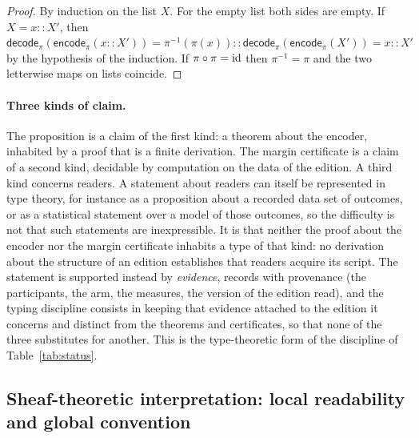 \begin{proof}
By induction on the list $X$. For the empty list both sides are empty. If $X=x::X'$, then $\mathsf{decode}_\pi(\mathsf{encode}_\pi(x::X'))=\pi^{-1}(\pi(x))::\mathsf{decode}_\pi(\mathsf{encode}_\pi(X'))=x::X'$ by the hypothesis of the induction. If $\pi\circ\pi=\mathrm{id}$ then $\pi^{-1}=\pi$ and the two letterwise maps on lists coincide.
\end{proof}

\paragraph{Three kinds of claim.}
The proposition is a claim of the first kind: a theorem about the encoder, inhabited by a proof that is a finite derivation. The margin certificate is a claim of a second kind, decidable by computation on the data of the edition. A third kind concerns readers. A statement about readers can itself be represented in type theory, for instance as a proposition about a recorded data set of outcomes, or as a statistical statement over a model of those outcomes, so the difficulty is not that such statements are inexpressible. It is that neither the proof about the encoder nor the margin certificate inhabits a type of that kind: no derivation about the structure of an edition establishes that readers acquire its script. The statement is supported instead by \emph{evidence}, records with provenance (the participants, the arm, the measures, the version of the edition read), and the typing discipline consists in keeping that evidence attached to the edition it concerns and distinct from the theorems and certificates, so that none of the three substitutes for another. This is the type-theoretic form of the discipline of Table~\ref{tab:status}.

\subsection{Sheaf-theoretic interpretation: local readability and global convention}


